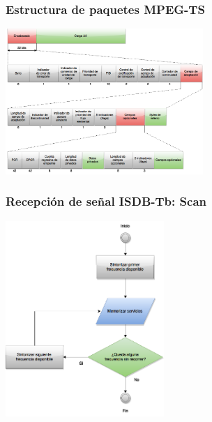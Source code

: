 \documentclass[a4paper,11pt]{beamer}
\begin{document}
					

			\begin{frame}
				\frametitle{Estructura de paquetes MPEG-TS}
				\begin{center}
					\includegraphics[width=7.5cm]{appendix_ts_packet_detail.png}
				\end{center}
			\end{frame}



			\begin{frame}
				\frametitle{Recepción de señal ISDB-Tb: Scan}
				\begin{center}
					\includegraphics[width=6cm]{proceso_scan.png}
				\end{center}
			\end{frame}
\end{document}
